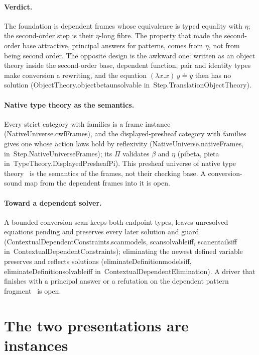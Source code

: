 \documentclass[11pt]{article}
\theoremstyle{remark}
\newcommand{\lean}[1]{{\ttfamily\def\_{\textunderscore\allowbreak}#1}}
\newcommand{\inmod}[1]{in~{\ttfamily\def\_{\textunderscore\allowbreak}#1}}
\begin{document}
\paragraph{Verdict.} The foundation is dependent frames whose equivalence is typed equality with
$\eta$; the second-order step is their $\eta$-long fibre. The property that made the second-order base
attractive, principal answers for patterns, comes from $\eta$, not from being second order. The
opposite design is the awkward one: written as an object theory inside the second-order base,
dependent function, pair and identity types make conversion a rewriting, and the equation
$(\lambda x.x)\,y\doteq y$ then has no solution (\lean{ObjectTheory.object\_beta\_unsolvable}
\inmod{Step.TranslationObjectTheory}).

\paragraph{Native type theory as the semantics.} Every strict category with families is a frame
instance (\lean{NativeUniverse.cwfFrames}), and the displayed-presheaf category with families gives one
whose action laws hold by reflexivity (\lean{NativeUniverse.nativeFrames}, \inmod{Step.NativeUniverseFrames});
its $\Pi$ validates $\beta$ and $\eta$ (\lean{pi\_beta}, \lean{pi\_eta} \inmod{TypeTheory.DisplayedPresheafPi}). This
presheaf universe of native type theory~\cite{williamsstay21} is the semantics of the frames, not their
checking base. A conversion-sound map from the dependent frames into it is open.

\paragraph{Toward a dependent solver.} A bounded conversion scan keeps both endpoint types, leaves
unresolved equations pending and preserves every later solution and guard
(\lean{ContextualDependentConstraints.scan\_models}, \lean{scan\_solvable\_iff}, \lean{scan\_entails\_iff}
\inmod{ContextualDependentConstraints}); eliminating the newest defined variable preserves and reflects
solutions (\lean{eliminateDefinition\_models\_iff}, \lean{eliminateDefinition\_solvable\_iff}
\inmod{ContextualDependentElimination}). A driver that finishes with a principal answer or a refutation on
the dependent pattern fragment~\cite{pfenning91,abelpientka11} is open.

\section{The two presentations are instances}
\end{document}
